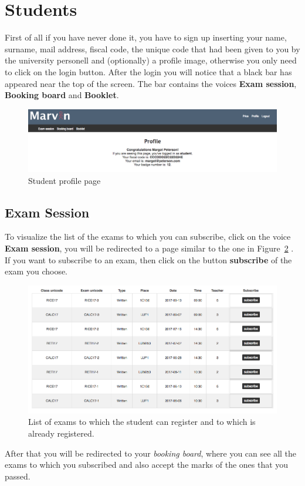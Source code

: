 \newpage
\section{Students}
First of all if you have never done it, you have to sign up inserting your name, surname, mail address, fiscal code, the unique code that had been given to you by the university personell and (optionally) a profile image, otherwise you only need to click on the login button.
After the login you will notice that a black bar has appeared near the top of the screen. The bar contains the voices \textbf{Exam session}, \textbf{Booking board} and \textbf{Booklet}.

\begin{figure}[H]
	\centering
	\includegraphics[width=1.0\textwidth]{img/studentProfile.png}
	\caption{Student profile page }
	\label{fig:studentProfile}
\end{figure}

\subsection{Exam Session}
To visualize the list of the exams to which you can subscribe, click on the voice \textbf{Exam session}, you will be redirected to a page similar to the one in Figure~\ref{fig:studentExams} . If you want to subscribe to an exam, then click on the button \textbf{subscribe} of the exam you choose.
\begin{figure}[H]
\centering
\includegraphics[width=1.0\textwidth]{img/studentExams.png}
\caption{List of exams to which the student can register and to which is already registered.}
\label{fig:studentExams}
\end{figure}
After that you will be redirected to your \emph{booking board}, where you can see all the exams to which you subscribed and also accept the marks of the ones that you passed.

